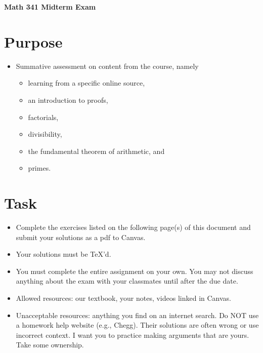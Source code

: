 \documentclass[12pt]{article}
\begin{document}
	\begin{center}
		{\Large \bf Math 341 Midterm Exam}
	\end{center}
	\section*{Purpose}
		\begin{itemize}
			\item Summative assessment on content from the course, namely
				\begin{itemize}
					\item learning from a specific online source,
					\item an introduction to proofs,
					\item factorials,
					\item divisibility,
					\item the fundamental theorem of arithmetic, and
					\item primes.
				\end{itemize}
		\end{itemize}
	\section*{Task}
		\begin{itemize}
			\item Complete the exercises listed on the following page(s) of this document and submit your solutions as a pdf to Canvas.
			\item Your solutions must be TeX'd.
			\item You must complete the entire assignment on your own.  You may not discuss anything about the exam with your classmates until after the due date.
			\item Allowed resources: our textbook, your notes, videos linked in Canvas.
			\item Unacceptable resources: anything you find on an internet search. Do NOT use a homework help website (e.g., Chegg). Their solutions are often wrong or use incorrect context.  I want you to practice making arguments that are yours. Take some ownership.
		\end{itemize}
\end{document}
